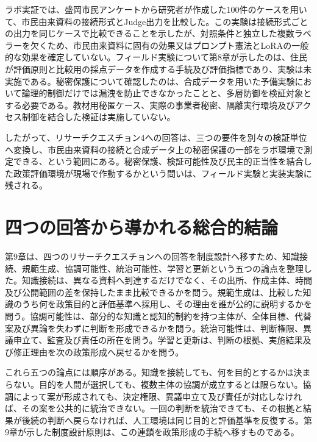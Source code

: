 ラボ実証では、盛岡市民アンケートから研究者が作成した100件のケースを用いて、市民由来資料の接続形式とJudge出力を比較した。この実験は接続形式ごとの出力を同じケースで比較できることを示したが、対照条件と独立した複数ラベラーを欠くため、市民由来資料に固有の効果又はプロンプト憲法とLoRAの一般的な効果を確定していない。フィールド実験について第8章が示したのは、住民が評価原則と比較用の採点データを作成する手続及び評価指標であり、実験は未実施である。秘密保護について確認したのは、合成データを用いた予備実験において論理的制御だけでは漏洩を防止できなかったことと、多層防御を検証対象とする必要である。教材用秘匿ケース、実際の事業者秘密、隔離実行環境及びアクセス制御を結合した検証は実施していない。

したがって、リサーチクエスチョン4への回答は、三つの要件を別々の検証単位へ変換し、市民由来資料の接続と合成データ上の秘密保護の一部をラボ環境で測定できる、という範囲にある。秘密保護、検証可能性及び民主的正当性を結合した政策評価環境が現場で作動するかという問いは、フィールド実験と実装実験に残される。

\section{四つの回答から導かれる総合的結論}
\label{sec:ch10_integrated_conclusion}

第9章は、四つのリサーチクエスチョンへの回答を制度設計へ移すため、知識接続、規範生成、協調可能性、統治可能性、学習と更新という五つの論点を整理した。知識接続は、異なる資料へ到達するだけでなく、その出所、作成主体、時間及び公開範囲の差を保持したまま比較できるかを問う。規範生成は、比較した知識のうち何を政策目的と評価基準へ採用し、その理由を誰が公的に説明するかを問う。協調可能性は、部分的な知識と認知的制約を持つ主体が、全体目標、代替案及び異論を失わずに判断を形成できるかを問う。統治可能性は、判断権限、異議申立て、監査及び責任の所在を問う。学習と更新は、判断の根拠、実施結果及び修正理由を次の政策形成へ戻せるかを問う。

これら五つの論点には順序がある。知識を接続しても、何を目的とするかは決まらない。目的を人間が選択しても、複数主体の協調が成立するとは限らない。協調によって案が形成されても、決定権限、異議申立て及び責任が対応しなければ、その案を公共的に統治できない。一回の判断を統治できても、その根拠と結果が後続の判断へ戻らなければ、人工環境は同じ目的と評価基準を反復する。第9章が示した制度設計原則は、この連鎖を政策形成の手続へ移すものである。

